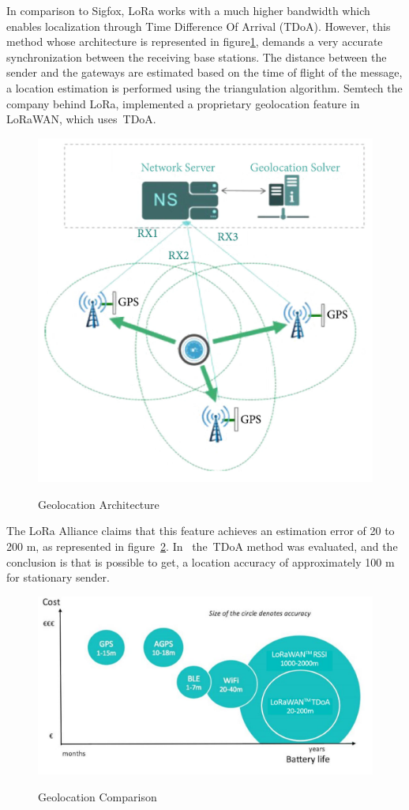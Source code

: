 In comparison to Sigfox, LoRa works with a much higher bandwidth which enables localization through Time Difference Of Arrival (TDoA). However, this method whose architecture is represented in figure\ref{fig:lora_Geo_Arch}, demands a  very accurate synchronization between the receiving base stations. The distance between the sender and the gateways are estimated based on the time of flight of the message, a location estimation is performed using the triangulation algorithm. Semtech the company behind LoRa, implemented a proprietary geolocation feature in LoRaWAN, which uses~\gls{TDoA}. \newline\newline\newline
\begin{figure}[htbp]
  \centering
    {\includegraphics[width=0.5\linewidth]{Chapters/Figures/lorageo.JPG}}%
  \caption{Geolocation Architecture~\cite{Podevijn2018}}
  \label{fig:lora_Geo_Arch}
\end{figure}
\newpage
The LoRa Alliance claims that this feature achieves an estimation error of 20 to 200 m, as represented in figure~\ref{fig:lora_Geo_compare}. In~\cite{Fargas2017RL1} the~\gls{TDoA} method was evaluated, and the conclusion is  that is possible to get, a location accuracy of approximately 100 m for stationary sender.\newline
\begin{figure}[htbp]
  \centering
    {\includegraphics[width=0.65\linewidth]{Chapters/Figures/lorageocopare.JPG}}%
  \caption{Geolocation Comparison~\cite{LoRa-Geo-White}}
  \label{fig:lora_Geo_compare}
\end{figure}
